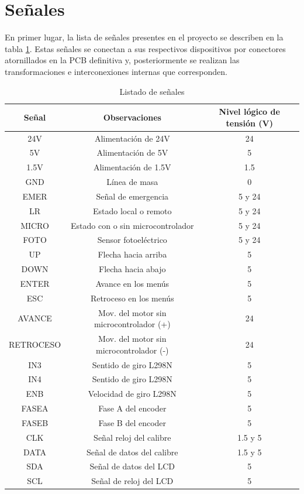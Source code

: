 \section{Señales}

En primer lugar, la lista de señales presentes en el proyecto se describen en la tabla \ref{tab:tab2}.
Estas señales se conectan a sus respectivos dispositivos por conectores atornillados en la PCB definitiva
y, posteriormente se realizan las transformaciones e interconexiones internas que corresponden.

\begin{table}[hbtp]
    \begin{center}
    \begin{tabular}{ | c | c | c | }
    \hline
    Señal & Observaciones & Nivel lógico de tensión (V)\\ \hline
    24V & Alimentación de 24V & 24\\
    5V & Alimentación de 5V &5\\
    1.5V & Alimentación de 1.5V& 1.5\\
    GND & Línea de masa &0\\
    EMER & Señal de emergencia & 5 y 24 \\
    LR &  Estado local o remoto & 5 y 24  \\
    MICRO &  Estado con o sin microcontrolador & 5 y 24 \\
    FOTO & Sensor fotoeléctrico &5 y 24\\
    UP & Flecha hacia arriba &5\\
    DOWN & Flecha hacia abajo &5\\    
    ENTER & Avance en los menús &5\\
    ESC & Retroceso en los menús &5\\
    AVANCE & Mov. del motor sin microcontrolador (+) &24\\
    RETROCESO & Mov. del motor sin microcontrolador (-) & 24\\
    IN3 & Sentido de giro L298N &5\\
    IN4 & Sentido de giro L298N &5\\
    ENB & Velocidad de giro L298N &5\\
    FASEA & Fase A del encoder &5\\
    FASEB & Fase B del encoder &5\\
    CLK & Señal reloj del calibre &1.5 y 5\\
    DATA & Señal de datos del calibre &1.5 y 5\\
    SDA & Señal de datos del LCD &5\\
    SCL & Señal de reloj del LCD &5\\
    
    \hline

    \end{tabular}
    \end{center}
    \caption{Listado de señales}
    \label{tab:tab2}
\end{table}

